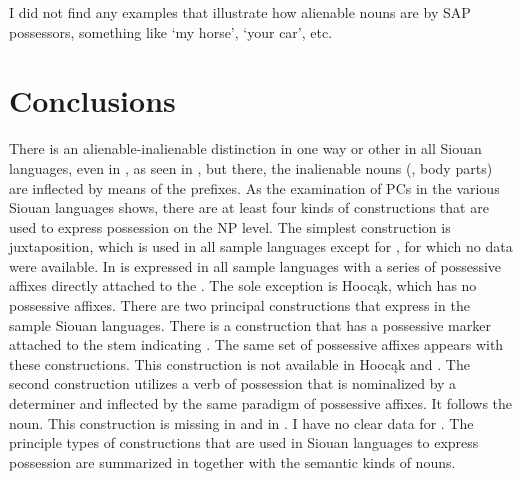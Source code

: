 \documentclass[output=paper]{LSP/langsci}
\begin{document}
I did not find any examples that illustrate how alienable nouns are  by SAP possessors, something like `my horse', `your car', etc.

\section{Conclusions}
 
There is an alienable-inalienable distinction in one way or other in all Siouan languages, even in , as seen in , but there, the inalienable nouns (, body parts) are inflected by means of the  prefixes. As the examination of PCs in the various Siouan languages shows, there are at least four kinds of constructions that are used to express possession on the NP level. The simplest construction is  juxtaposition, which is used in all sample languages except for , for which no data were available. In is expressed in all sample languages with a series of possessive affixes directly attached to the . The sole exception is Hoocąk, which has no possessive affixes. There are two principal constructions that express  in the sample Siouan languages. There is a construction that has a possessive marker attached to the stem indicating . The same set of possessive affixes appears with these constructions. This construction is not available in Hoocąk and . The second construction utilizes a verb of possession that is nominalized by a determiner and inflected by the same paradigm of possessive affixes. It follows the  noun. This construction is missing in  and in . I have no clear data for . The principle types of constructions that are used in Siouan languages to express possession are summarized in  together with the semantic kinds of  nouns. 
 
\end{document}
